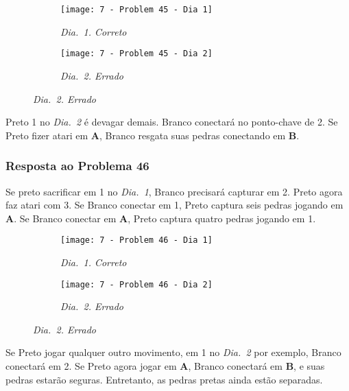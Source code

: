 \begin{figure}[h!]
    \centering
    \begin{subfigure}[t]{.425\textwidth}
        \texttt{[image: 7 - Problem 45 - Dia 1]}
        \captionsetup{justification=centering}
        \caption*{\emph{Dia.\@~1. Correto}}
    \end{subfigure}
    \hspace{1cm}
    \begin{subfigure}[t]{.425\textwidth}
        \texttt{[image: 7 - Problem 45 - Dia 2]}
        \captionsetup{justification=centering}
        \caption*{\emph{Dia.\@~2. Errado}}
    \end{subfigure}
\end{figure}

Preto 1 no \emph{Dia.\@~2} é devagar demais. Branco conectará no ponto-chave de 2. Se Preto fizer atari em \textbf{A}, Branco resgata suas pedras conectando em \textbf{B}.

\pagebreak

\subsubsection*{Resposta ao Problema 46}

Se preto sacrificar em 1 no \emph{Dia.\@~1}, Branco precisará capturar em 2. Preto agora faz atari com 3. Se Branco conectar em 1, Preto captura seis pedras jogando em \textbf{A}. Se Branco conectar em \textbf{A}, Preto captura quatro pedras jogando em 1.
 
\begin{figure}[h!]
    \centering
    \begin{subfigure}[t]{.425\textwidth}
        \texttt{[image: 7 - Problem 46 - Dia 1]}
        \captionsetup{justification=centering}
        \caption*{\emph{Dia.\@~1. Correto}}
    \end{subfigure}
    \hspace{1cm}
    \begin{subfigure}[t]{.425\textwidth}
        \texttt{[image: 7 - Problem 46 - Dia 2]}
        \captionsetup{justification=centering}
        \caption*{\emph{Dia.\@~2. Errado}}
    \end{subfigure}
\end{figure}

Se Preto jogar qualquer outro movimento, em 1 no \emph{Dia.\@~2} por exemplo, Branco conectará em 2. Se Preto agora jogar em \textbf{A}, Branco conectará em \textbf{B}, e suas pedras estarão seguras. Entretanto, as pedras pretas ainda estão separadas.